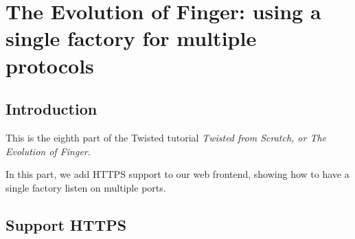 \section{The Evolution of Finger: using a single factory for     multiple protocols\label{doc/howto/tutorial/factory.xhtml}}


\subsection{Introduction}


 This is the eighth part of the Twisted tutorial \textit{Twisted from Scratch, or The Evolution of Finger}.

In this part, we add HTTPS support to our web frontend, showing how to have a single factory listen on multiple ports.

\subsection{Support HTTPS}


